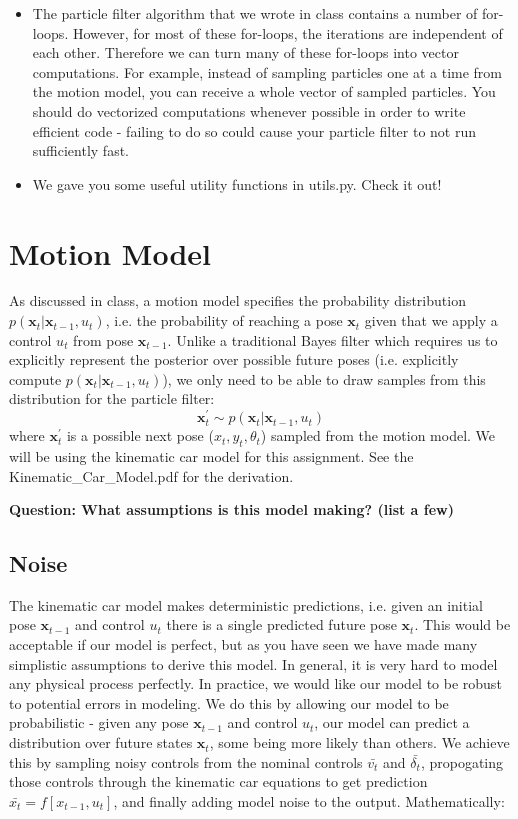 \documentclass[final]{article}
\begin{document}
\begin{itemize}
\item The particle filter algorithm that we wrote in class contains a number of for-loops. However, for most of these for-loops, the iterations are independent of each other. Therefore we can turn many of these for-loops into vector computations. For example, instead of sampling particles one at a time from the motion model, you can receive a whole vector of sampled particles. You should do vectorized computations whenever possible in order to write efficient code - failing to do so could cause your particle filter to not run sufficiently fast.

\item We gave you some useful utility functions in utils.py. Check it out!

\end{itemize}

\section{ Motion Model}
As discussed in class, a motion model specifies the probability distribution $p(\mathbf{x}_t | \mathbf{x}_{t-1}, u_t)$, i.e. the probability of reaching a pose $\mathbf{x}_t$ given that we apply a control $u_t$ from pose $\mathbf{x}_{t-1}$. Unlike a traditional Bayes filter which requires us to explicitly represent the posterior over possible future poses (i.e. explicitly compute $p(\mathbf{x}_t | \mathbf{x}_{t-1}, u_t)$),  we only need to be able to draw samples from this distribution for the particle filter:
\begin{equation}
\mathbf{x}^\prime_t \sim p(\mathbf{x}_t | \mathbf{x}_{t-1}, u_t) 
\end{equation}
where $\mathbf{x}^\prime_t$ is a possible next pose ($x_t,y_t,\theta_t$) sampled from the motion model. We will be using the kinematic car model for this assignment. See the Kinematic\_Car\_Model.pdf for the derivation.

\textbf{Question: What assumptions is this model making? (list a few)}

\subsection{Noise}
The kinematic car model makes deterministic predictions, i.e. given an initial pose $\mathbf{x}_{t-1}$ and control $u_t$ there is a single predicted future pose $\mathbf{x}_t$. This would be acceptable if our model is perfect, but as you have seen we have made many simplistic assumptions to derive this model. In general, it is very hard to model any physical process perfectly. In practice, we would like our model to be robust to  potential errors in modeling. We do this by allowing our model to be probabilistic - given any pose $\mathbf{x}_{t-1}$ and control $u_t$, our model can predict a distribution over future states $\mathbf{x}_t$, some being more likely than others. We achieve this by sampling noisy controls from the nominal controls $\bar{v_t}$ and $\bar{\delta_t}$, propogating those controls through the kinematic car equations to get prediction $\bar{x_t} = f[x_{t-1},u_t]$, and finally adding model noise to the output. Mathematically: 
\end{document}
